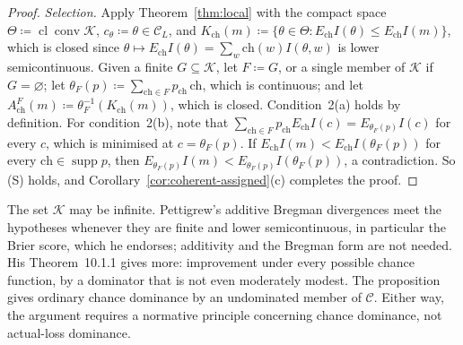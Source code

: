 \documentclass[11pt]{article}
\theoremstyle{definition}
\newcommand{\C}{\mathcal C}
\newcommand{\supp}{\operatorname{supp}}
\begin{document}
{\begin{proof}
\emph{Selection.} Apply Theorem~\ref{thm:local} with the compact space $\Theta\coloneqq\operatorname{cl}\operatorname{conv}\mathcal K$, $c_\theta\coloneqq\theta\in\C_L$, and $K_{\mathrm{ch}}(m)\coloneqq\{\theta\in\Theta:E_{\mathrm{ch}}I(\theta)\le E_{\mathrm{ch}}I(m)\}$, which is closed since $\theta\mapsto E_{\mathrm{ch}}I(\theta)=\sum_w\mathrm{ch}(w)I(\theta,w)$ is lower semicontinuous. Given a finite $G\subseteq\mathcal K$, let $F\coloneqq G$, or a single member of $\mathcal K$ if $G=\varnothing$; let $\theta_F(p)\coloneqq\sum_{\mathrm{ch}\in F}p_{\mathrm{ch}}\,\mathrm{ch}$, which is continuous; and let $A^F_{\mathrm{ch}}(m)\coloneqq\theta_F^{-1}(K_{\mathrm{ch}}(m))$, which is closed. Condition~2(a) holds by definition. For condition~2(b), note that $\sum_{\mathrm{ch}\in F}p_{\mathrm{ch}}E_{\mathrm{ch}}I(c)=E_{\theta_F(p)}I(c)$ for every $c$, which is minimised at $c=\theta_F(p)$. If $E_{\mathrm{ch}}I(m)<E_{\mathrm{ch}}I(\theta_F(p))$ for every $\mathrm{ch}\in\supp p$, then $E_{\theta_F(p)}I(m)<E_{\theta_F(p)}I(\theta_F(p))$, a contradiction. So (S) holds, and Corollary~\ref{cor:coherent-assigned}(c) completes the proof.
\end{proof}
The set $\mathcal K$ may be infinite. Pettigrew's additive Bregman divergences meet the hypotheses whenever they are finite and lower semicontinuous, in particular the Brier score, which he endorses; additivity and the Bregman form are not needed. His Theorem~10.1.1 gives more: improvement under every possible chance function, by a dominator that is not even moderately modest. The proposition gives ordinary chance dominance by an undominated member of $\C$. Either way, the argument requires a normative principle concerning chance dominance, not actual-loss dominance.}



\end{document}
